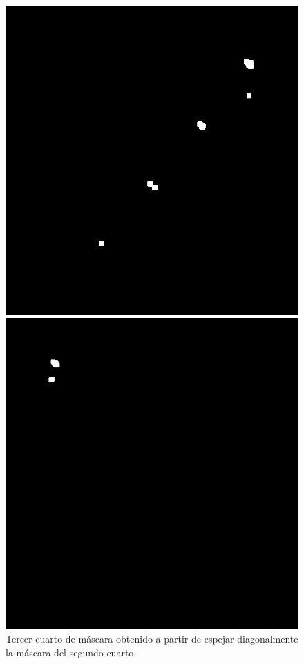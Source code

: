 \documentclass[10pt,a4paper, twoside]{report}
\begin{document}
\begin{figure}[!htb]
   \begin{minipage}{0.48\textwidth}
			\centering
			\includegraphics[width=1.0\linewidth]{imagenes/trdQuarterFourierMask.jpg}
			\caption{Tercer cuarto de máscara obtenido a partir de espejar diagonalmente la máscara del segundo cuarto.}
			\label{thirdQuarterMask}
   \end{minipage}\hfill
   \begin {minipage}{0.48\textwidth}
			\centering
			\includegraphics[width=1.0\linewidth]{imagenes/fthQuarterFourierMask.jpg}

\end{minipage}
\end{figure}
\end{document}
